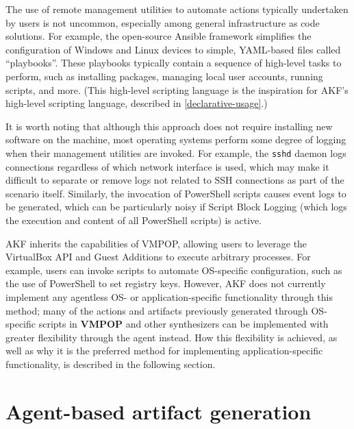 The use of remote management utilities to automate actions typically
undertaken by users is not uncommon, especially among general
infrastructure as code solutions. For example, the open-source Ansible
framework simplifies the configuration of Windows and Linux devices to
simple, YAML-based files called ``playbooks''. These playbooks typically
contain a sequence of high-level tasks to perform, such as installing
packages, managing local user accounts, running scripts, and more. (This
high-level scripting language is the inspiration for AKF's high-level
scripting language, described in \autoref{declarative-usage}.)

It is worth noting that although this approach does not require
installing new software on the machine, most operating systems perform
some degree of logging when their management utilities are invoked. For
example, the \passthrough{\lstinline!sshd!} daemon logs connections
regardless of which network interface is used, which may make it
difficult to separate or remove logs not related to SSH connections as
part of the scenario itself. Similarly, the invocation of PowerShell
scripts causes event logs to be generated, which can be particularly
noisy if Script Block Logging (which logs the execution and content of
all PowerShell scripts) is active.

AKF inherits the capabilities of VMPOP, allowing users to leverage the
VirtualBox API and Guest Additions to execute arbitrary processes. For
example, users can invoke scripts to automate OS-specific configuration,
such as the use of PowerShell to set registry keys. However, AKF does
not currently implement any agentless OS- or application-specific
functionality through this method; many of the actions and artifacts
previously generated through OS-specific scripts in \textbf{VMPOP} and
other synthesizers can be implemented with greater flexibility through
the agent instead. How this flexibility is achieved, as well as why it
is the preferred method for implementing application-specific
functionality, is described in the following section.

\section{Agent-based artifact
generation}\label{agent-based-artifact-generation}

